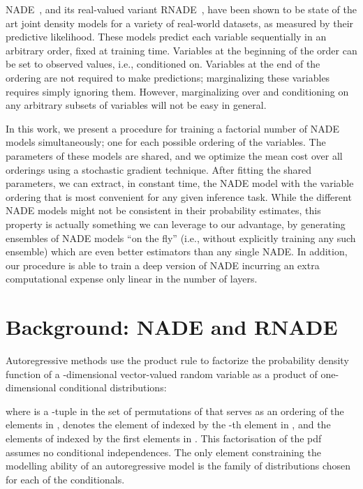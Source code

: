 \documentclass{article}
\begin{document}
NADE~\cite{Larochelle+Murray-2011}, and its real-valued variant RNADE~\cite{UriaB2013}, have been shown to be
state of the art joint density models for a variety of real-world datasets, as
measured by their predictive likelihood.
These models predict each variable sequentially in an arbitrary order, fixed at
training time. Variables at the beginning of the order can be set to observed
values, i.e., conditioned on. Variables at the end of the ordering are not
required to make predictions; marginalizing these variables requires simply
ignoring them. However, marginalizing over and conditioning on any arbitrary
subsets of variables will not be easy in general.

In this work, we present a procedure for training a factorial number of
NADE models simultaneously; one for each possible ordering of the variables.
The parameters of these models are shared, and we optimize the mean cost over all
orderings using a stochastic gradient technique.
After fitting the shared parameters, we can
extract, in constant time, the NADE model with the variable ordering that
is most convenient for any given inference task. While the different NADE models
might not be consistent in their probability estimates, this property is
actually something we can leverage to our advantage, by generating ensembles of
NADE models ``on the fly'' (i.e., without explicitly training any such ensemble)
which are even better estimators than any single NADE\@. In addition, our
procedure is able to train a deep version of NADE incurring an extra
computational expense only linear in the number of layers.

\section{Background: NADE and RNADE}

Autoregressive methods use the product rule to factorize the probability density
function of a -dimensional vector-valued random variable  as a
product of one-dimensional conditional distributions:

where  is a -tuple in the set of
permutations of  that serves as an ordering of the elements in
,  denotes the element of  indexed by the -th
 element  in , and  the elements of  indexed by the first
 elements in . This factorisation of the pdf assumes no conditional
independences. The only element constraining the modelling ability of an
autoregressive model is the family of distributions chosen for each of the
conditionals.
\end{document}
